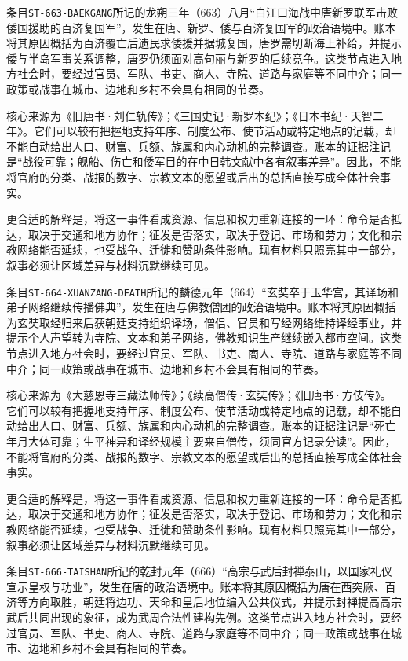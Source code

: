 条目\texttt{ST-663-BAEKGANG}所记的龙朔三年（663）八月“白江口海战中唐新罗联军击败倭国援助的百济复国军”，发生在唐、新罗、倭与百济复国军的政治语境中。账本将其原因概括为百济覆亡后遗民求倭援并据城复国，唐罗需切断海上补给，并提示倭与半岛军事关系调整，唐罗仍须面对高句丽与新罗的后续竞争。这类节点进入地方社会时，要经过官员、军队、书吏、商人、寺院、道路与家庭等不同中介；同一政策或战事在城市、边地和乡村不会具有相同的节奏。

核心来源为《旧唐书·刘仁轨传》；《三国史记·新罗本纪》；《日本书纪·天智二年》。它们可以较有把握地支持年序、制度公布、使节活动或特定地点的记载，却不能自动给出人口、财富、兵额、族属和内心动机的完整调查。账本的证据注记是“战役可靠；舰船、伤亡和倭军目的在中日韩文献中各有叙事差异”。因此，不能将官府的分类、战报的数字、宗教文本的愿望或后出的总括直接写成全体社会事实。

更合适的解释是，将这一事件看成资源、信息和权力重新连接的一环：命令是否抵达，取决于交通和地方协作；征发是否落实，取决于登记、市场和劳力；文化和宗教网络能否延续，也受战争、迁徙和赞助条件影响。现有材料只照亮其中一部分，叙事必须让区域差异与材料沉默继续可见。


条目\texttt{ST-664-XUANZANG-DEATH}所记的麟德元年（664）“玄奘卒于玉华宫，其译场和弟子网络继续传播佛典”，发生在唐与佛教僧团的政治语境中。账本将其原因概括为玄奘取经归来后获朝廷支持组织译场，僧侣、官员和写经网络维持译经事业，并提示个人声望转为寺院、文本和弟子网络，佛教知识生产继续嵌入都市空间。这类节点进入地方社会时，要经过官员、军队、书吏、商人、寺院、道路与家庭等不同中介；同一政策或战事在城市、边地和乡村不会具有相同的节奏。

核心来源为《大慈恩寺三藏法师传》；《续高僧传·玄奘传》；《旧唐书·方伎传》。它们可以较有把握地支持年序、制度公布、使节活动或特定地点的记载，却不能自动给出人口、财富、兵额、族属和内心动机的完整调查。账本的证据注记是“死亡年月大体可靠；生平神异和译经规模主要来自僧传，须同官方记录分读”。因此，不能将官府的分类、战报的数字、宗教文本的愿望或后出的总括直接写成全体社会事实。

更合适的解释是，将这一事件看成资源、信息和权力重新连接的一环：命令是否抵达，取决于交通和地方协作；征发是否落实，取决于登记、市场和劳力；文化和宗教网络能否延续，也受战争、迁徙和赞助条件影响。现有材料只照亮其中一部分，叙事必须让区域差异与材料沉默继续可见。


条目\texttt{ST-666-TAISHAN}所记的乾封元年（666）“高宗与武后封禅泰山，以国家礼仪宣示皇权与功业”，发生在唐的政治语境中。账本将其原因概括为唐在西突厥、百济等方向取胜，朝廷将边功、天命和皇后地位编入公共仪式，并提示封禅提高高宗武后共同出现的象征，成为武周合法性建构先例。这类节点进入地方社会时，要经过官员、军队、书吏、商人、寺院、道路与家庭等不同中介；同一政策或战事在城市、边地和乡村不会具有相同的节奏。


